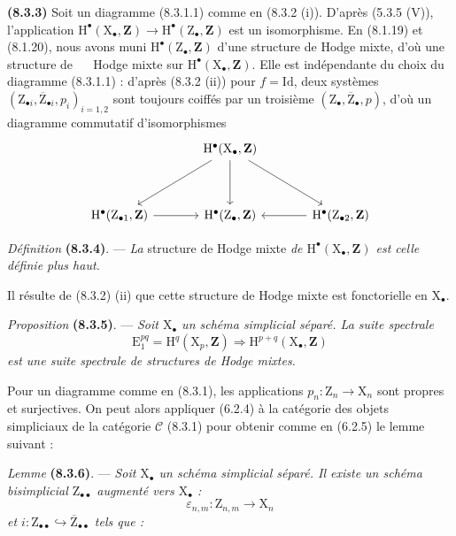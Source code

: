\documentclass[11pt,leqno]{article}
\newcommand{\Page}[1]{\ifvmode\noindent\else\unskip\ \fi{\footnotesize\textcolor{gray}{[p.\,#1]}}\ \ignorespaces}
\begin{document}
\textbf{(8.3.3)} Soit un diagramme (8.3.1.1) comme en (8.3.2 (i)). D’après (5.3.5 (V)), l’application \(\mathrm{H}^\bullet(\mathrm{X}_\bullet,\mathbf{Z})\to\mathrm{H}^\bullet(\mathrm{Z}_\bullet,\mathbf{Z})\) est un isomorphisme. En (8.1.19) et (8.1.20), nous avons muni \(\mathrm{H}^\bullet(\mathrm{Z}_\bullet,\mathbf{Z})\) d’une structure de Hodge mixte, d’où une structure de
\Page{42}
Hodge mixte sur \(\mathrm{H}^\bullet(\mathrm{X}_\bullet,\mathbf{Z})\). Elle est indépendante du choix du diagramme (8.3.1.1) : d’après (8.3.2 (ii)) pour \(f=\mathrm{Id}\), deux systèmes \((\mathrm{Z}_{\bullet i},\overline{\mathrm{Z}}_{\bullet i},p_i)_{i=1,2}\) sont toujours coiffés par un troisième \((\mathrm{Z}_\bullet,\overline{\mathrm{Z}}_\bullet,p)\), d’où un diagramme commutatif d’isomorphismes
\[
\begin{tikzcd}[column sep=large,row sep=huge]
 & \mathrm{H}^\bullet(\mathrm{X}_\bullet,\mathbf{Z})
   \arrow[dl] \arrow[d] \arrow[dr] &\\
\mathrm{H}^\bullet(\mathrm{Z}_{\bullet1},\mathbf{Z}) \arrow[r]
 & \mathrm{H}^\bullet(\mathrm{Z}_\bullet,\mathbf{Z})
 & \mathrm{H}^\bullet(\mathrm{Z}_{\bullet2},\mathbf{Z}) \arrow[l]
\end{tikzcd}
\]

\textit{Définition} \textbf{(8.3.4)}. — \textit{La} structure de Hodge mixte \textit{de \(\mathrm{H}^\bullet(\mathrm{X}_\bullet,\mathbf{Z})\) est celle définie plus haut.}

Il résulte de (8.3.2) (ii) que cette structure de Hodge mixte est fonctorielle en \(\mathrm{X}_\bullet\).

\textit{Proposition} \textbf{(8.3.5)}. — \textit{Soit \(\mathrm{X}_\bullet\) un schéma simplicial séparé. La suite spectrale}
\[
\mathrm{E}_1^{pq}=\mathrm{H}^q(\mathrm{X}_p,\mathbf{Z})
\Rightarrow\mathrm{H}^{p+q}(\mathrm{X}_\bullet,\mathbf{Z})
\]
\textit{est une suite spectrale de structures de Hodge mixtes.}

Pour un diagramme comme en (8.3.1), les applications \(p_n:\mathrm{Z}_n\to\mathrm{X}_n\) sont propres et surjectives. On peut alors appliquer (6.2.4) à la catégorie des objets simpliciaux de la catégorie \(\mathcal{C}\) (8.3.1) pour obtenir comme en (6.2.5) le lemme suivant :

\textit{Lemme} \textbf{(8.3.6)}. — \textit{Soit \(\mathrm{X}_\bullet\) un schéma simplicial séparé. Il existe un schéma bisimplicial \(\mathrm{Z}_{\bullet\bullet}\) augmenté vers \(\mathrm{X}_\bullet\) :}
\[
\varepsilon_{n,m}:\mathrm{Z}_{n,m}\to\mathrm{X}_n
\]
\textit{et \(i:\mathrm{Z}_{\bullet\bullet}\hookrightarrow\overline{\mathrm{Z}}_{\bullet\bullet}\) tels que :}
\end{document}
